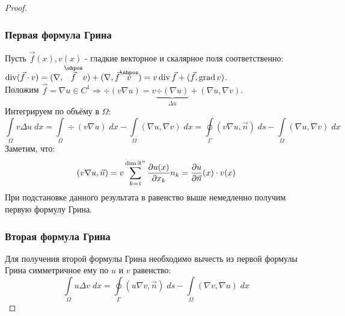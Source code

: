 \begin{proof}\ \\
\subsubsection{Первая формула Грина}
Пусть $\vec{f}(x), v(x)$ - гладкие векторное и скалярное поля соответственно: $\div(\vec{f} \cdot v) = (\nabla, \overset{\shpos}{\vec{f}}v) + (\nabla, \vec{f}\overset{\shpos}{v}) = v\div \vec{f} + (\vec{f}, \grad{v})$. \\
Положим $\vec{f} = \nabla u \in C^1 \Rightarrow \div (v \nabla u) = v \underbrace{\div(\nabla u)}_{\Delta u} + (\nabla u, \nabla v)$. \\
Интегрируем по объёму в $\Omega$:
\begin{equation*}
	\int\limits_{\Omega} v \Delta u\;dx = 	\int\limits_{\Omega} \div(v\nabla u)\;dx -\int\limits_{\Omega} (\nabla u, \nabla v)\;dx = \oint\limits_{\Gamma}(v \nabla u, \vec{n})\;ds - \int\limits_{\Omega}(\nabla u, \nabla v)\;dx
\end{equation*}
Заметим, что:
$$(v\nabla u, \vec{n}) = v \sum\limits_{k = 1}^{\dim \mathbb{R}^n}\dfrac{\partial u(x)}{\partial x_k} n_k = \dfrac{\partial u}{\partial \vec{n}}(x) \cdot v(x)$$
При подстановке данного результата в равенство выше немедленно получим первую формулу Грина.
\subsubsection{Вторая формула Грина}
Для получения второй формулы Грина необходимо вычесть из первой формулы Грина симметричное ему по $u$ и $v$ равенство:
$$\int\limits_{\Omega} u \Delta v\;dx = \oint\limits_{\Gamma}(u \nabla v, \vec{n})\;ds - \int\limits_{\Omega}(\nabla v, \nabla u)\;dx$$
\end{proof}

